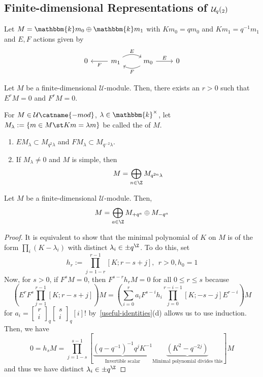 \documentclass[11pt,leqno,oneside]{amsbook}
\numberwithin{thm}{section}
\newcommand{\U}{\mathcal{U}}
\newcommand{\qbinom}[3][q]{\left[\begin{array}{c}#2\\#3\end{array}\right]_{#1}}
\renewcommand{\k}{\mathbbm{k}}
\begin{document}
\subsection{Finite-dimensional Representations of \(\U_q(\sl_2)\)}
\begin{example}
  Let \(M = \k m_0 \oplus \k m_1\) with \(K m_0 = qm_0\) and \(Km_1 =
  q^{-1}m_1\) and \(E,F\) actions given by \[
    \begin{tikzcd}
      0 & \ar[l, "F"] m_1 \ar[r, bend left, "E"] & \ar[l, bend left,
      "F"] m_0 \ar[r, "E"] & 0
    \end{tikzcd}
  \]
\end{example}
\begin{lem}
  Let \(M\) be a finite-dimensional \(\U\)-module. Then, there exists
  an \(r > 0\) such that \(E^r M = 0\) and \(F^r M = 0\).
\end{lem}
\begin{defn}
  For \(M \in \U\catname{-mod}\), \(\lambda \in \k^\times\), let
  \(M_\lambda := \{m \in M \st Km = \lambda m\}\) be called the
   of \(M\).
\end{defn}
\begin{lem}
  \begin{enumerate}
  \item \(E M_\lambda \subset M_{q^2 \lambda}\) and
    \(F M_{\lambda} \subset M_{q^{-2} \lambda}\).
  \item If \(M_\lambda \neq 0\) and \(M\) is simple, then \[
      M = \bigoplus_{n \in \Z} M_{q^{2n} \lambda}
    \]
  \end{enumerate}
\end{lem}
\begin{prop}
  Let \(M\) be a finite-dimensional \(\U\)-module. Then, \[
    M = \bigoplus_{a \in \Z} M_{+q^a} \oplus M_{-q^a}
  \]
\end{prop}
\begin{proof}
  It is equivalent to show that the minimal polynomial of \(K\) on
  \(M\) is of the form \(\prod_i (K-\lambda_i)\) with distinct
  \(\lambda_i \in \pm q^\Z\). To do this, set \[
    h_r := \prod_{j=1-r}^{r-1} [K;r-s+j], \ \ r > 0, h_0 = 1
  \]
  Now, for \(s > 0\), if \(F^s M = 0\), then \(F^{s-r}h_r M = 0\) for
  all \(0 \leq r \leq s\) because \[
    \left(E^r F^s \prod_{j=1}^{r-1} [K;r-s+j]\right) M = \left(
      \sum_{i=0}^r a_i F^{s-i} h_i \prod_{j=0}^{r-i-1}[K;-s-j] E^{r-i}\right)M
  \]
  for \(a_i = \qbinom{r}{i}\qbinom{s}{i} [i]!\)
  by~\ref{useful-identities}(d) allows us to use induction. Then, we
  have \[
    0 = h_s M = \prod_{j=1-s}^{s-1} \left[ \underbrace{(q-q^{-1})^{-1}
        q^j K^{-1}}_{\text{Invertible scalar}}
      \underbrace{(K^2-q^{-2j})}_{\text{Minimal polynomial divides this}} \right]M
  \]
  and thus we have distinct \(\lambda_i \in \pm q^{\Z}\)
\end{proof}
\begin{bibdiv}
  \begin{biblist}
  \end{biblist}
\end{bibdiv}
\end{document}
